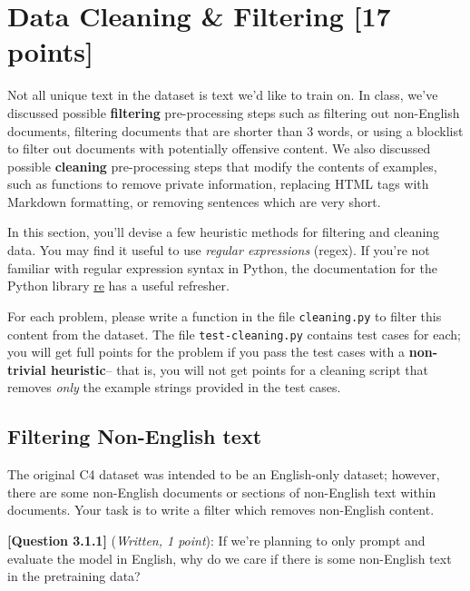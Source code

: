 \documentclass[leqno,12pt]{article}
\begin{document}
\begin{tcolorbox}[fit,height=3cm, width=\linewidth, blank, borderline={1pt}{-2pt}]
\end{tcolorbox}

\section{Data Cleaning \& Filtering [17 points]}
\noindent Not all unique text in the dataset is text we'd like to train on. In class, we've discussed possible \textbf{filtering} pre-processing steps such as filtering out non-English documents, filtering documents that are shorter than 3 words, or using a blocklist to filter out documents with potentially offensive content.
We also discussed possible \textbf{cleaning} pre-processing steps that modify the contents of examples, such as functions to remove private information, replacing HTML tags with Markdown formatting, or removing sentences which are very short.

In this section, you'll devise a few heuristic methods for filtering and cleaning data. You may find it useful to use \textit{regular expressions} (regex). If you're not familiar with regular expression syntax in Python, the documentation for the Python library \href{https://docs.python.org/3/library/re.html}{re} has a useful refresher. 

For each problem, please write a function in the file \texttt{cleaning.py} to filter this content from the dataset. The file \texttt{test-cleaning.py} contains test cases for each; you will get full points for the problem if you pass the test cases with a \textbf{non-trivial heuristic}-- that is, you will not get points for a cleaning script that removes \textit{only} the example strings provided in the test cases. 


\subsection{Filtering Non-English text}
\noindent The original C4 dataset was intended to be an English-only dataset; however, there are some non-English documents or sections of non-English text within documents. Your task is to write a filter which removes non-English content.

\noindent \textbf{[Question 3.1.1]} (\emph{Written, 1 point}): If we're planning to only prompt and evaluate the model in English, why do we care if there is some non-English text in the pretraining data? 
\begin{tcolorbox}[fit,height=3cm, width=\linewidth, blank, borderline={1pt}{-2pt}]
\end{tcolorbox}
\end{document}

